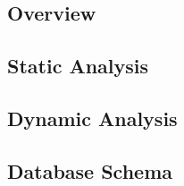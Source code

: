\subsection{Overview}
\subsection{Static Analysis}
\subsection{Dynamic Analysis}
\subsection{Database Schema}
